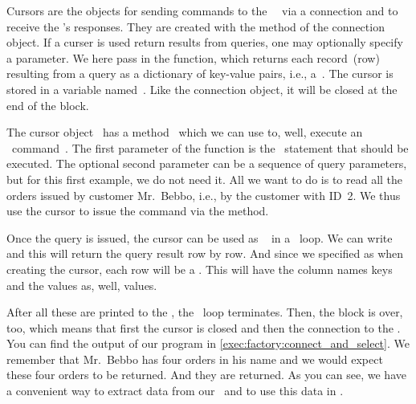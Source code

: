 Cursors are the objects for sending commands to the \postgresql\ \server\ via a connection and to receive the \server's responses.
They are created with the  method of the connection object.
If a curser is used return results from queries, one may optionally specify a  parameter.
We here pass in the  function, which returns each record~(row) resulting from a query as a dictionary of key-value pairs, i.e., a~.
The cursor is stored in a variable named~.
Like the connection object, it will be closed at the end of the  block.

The cursor object~ has a method~ which we can use to, well, execute an \sql\ command~\cite{PEP249}.
The first parameter of the function is the \sql\ statement that should be executed.
The optional second parameter can be a sequence of query parameters, but for this first example, we do not need it.
All we want to do is to read all the orders issued by customer Mr.~Bebbo, i.e., by the customer with ID~2.
We thus use the cursor  to issue the command  via the  method.

Once the query is issued, the cursor can be used as ~\cite{PEP234} in a ~loop.
We can write  and this will return the query result row by row.
And since we specified  as  when creating the cursor, each row will be a .
This  will have the column names keys and the values as, well, values.

After all these  are printed to the , the ~loop terminates.
Then, the  block is over, too, which means that first the cursor is closed and then the connection to the \db.
You can find the output of our program in \cref{exec:factory:connect_and_select}.
We remember that Mr.~Bebbo has four orders in his name and we would expect these four orders to be returned.
And they are returned.
As you can see, we have a convenient way to extract data from our \db\ and to use this data in \python.

